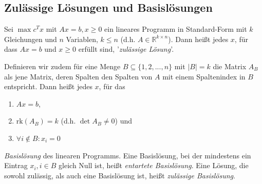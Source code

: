 \documentclass{article}
\begin{document}
\subsection{Zulässige Lösungen und Basislösungen}
Sei \(\max c^Tx\) mit \(Ax=b, x\geq0\) ein lineares Programm in Standard-Form mit \(k\) Gleichungen und \(n\) Variablen, \(k\leq n\) (d.h. \(A\in\mathbb R^{k\times n}\)). Dann heißt jedes \(x\), für dass \(Ax=b\) und \(x\geq0\) erfüllt sind, '\textit{zulässige Lösung}'. 

Definieren wir zudem für eine Menge \(B\subseteq\{1,2,...,n\}\) mit \(|B|=k\) die Matrix \(A_B\) als jene Matrix, deren Spalten den Spalten von \(A\) mit einem Spaltenindex in \(B\) entspricht. Dann heißt jedes \(x\), für das
\begin{enumerate}
    \item \(Ax=b\), 
    \item \(\text{rk}(A_B)=k\) (d.h. \(\det A_B\ne0\)) und
    \item \(\forall i\not\in B:x_i=0\)
\end{enumerate}
\textit{Basislösung} des linearen Programms. Eine Basislösung, bei der mindestens ein Eintrag \(x_i, i\in B\) gleich Null ist, heißt \textit{entartete Basislösung}. Eine Lösung, die sowohl zulässig, als auch eine Basislösung ist, heißt \textit{zulässige Basislösung}.
\end{document}

